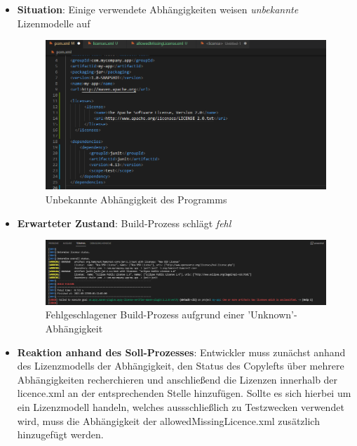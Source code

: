 \begin{itemize}
    \item \textbf{Situation}: Einige verwendete Abhängigkeiten weisen \textit{unbekannte} Lizenmodelle auf
    
    \newpage
    \begin{figure}[h]
        \centering
        \includegraphics[scale=0.5]{Bilder/Fall4Situation.png}
        \caption{Unbekannte Abhängigkeit des Programms}
    \end{figure}

    \item \textbf{Erwarteter Zustand}: Build-Prozess schlägt \textit{fehl} 
    
    \begin{figure}[h]
        \centering
        \includegraphics[scale=0.4]{Bilder/Fall4Zustand.png}
        \caption{Fehlgeschlagener Build-Prozess aufgrund einer 'Unknown'-Abhängigkeit}
    \end{figure}

    \item \textbf{Reaktion anhand des Soll-Prozesses}: Entwickler muss zunächst anhand des Lizenzmodells der Abhängigkeit, den Status des Copylefts über mehrere Abhängigkeiten recherchieren und anschließend die Lizenzen innerhalb der licence.xml an der entsprechenden Stelle hinzufügen. Sollte es sich hierbei um ein Lizenzmodell handeln, welches aussschließlich zu Testzwecken verwendet wird, muss die Abhängigkeit der allowedMissingLicence.xml zusätzlich hinzugefügt werden. 
\end{itemize}

